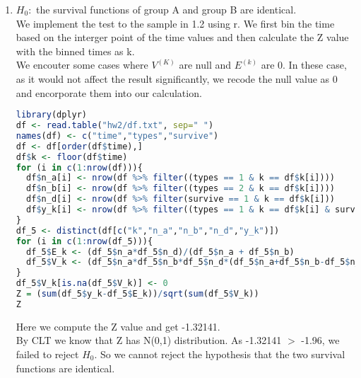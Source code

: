 \documentclass[11pt]{article}
\begin{document}
\begin{enumerate}
\begin{align*}
& (According \;to \;iid \;assumption \;of \;k)\\
& = Var[E[\sum \limits_{k=1}^{K-1} (y^{(k)} - E^{(k)})|(n_A^{(K)},n_B^{(K)},n_d^{(K)})]+0]+ E[Var[\sum \limits_{k=1}^{K-1} (y^{(k)} - E^{(k)})|(n_A^{(K)},n_B^{(K)},n_d^{(K)})]+\\
& Var[(y^{(K)} - E^{(K)})|(n_A^{(K)},n_B^{(K)},n_d^{(K)})]]\\
& = Var[\sum \limits_{k=1}^{K-1} (y^{(k)} - E^{(k)})]+ E[Var[(y^{(K)} - E^{(K)})|(n_A^{(K)},n_B^{(K)},n_d^{(K)})]]\\
& = Var[\sum \limits_{k=1}^{K-1} (y^{(k)} - E^{(k)})] + E[V^{(K)}]
\end{align*}
Similarly, we can apply this process to every other value of k, and get that:\\
$$Var[\sum \limits_{k=1}^K (y^{(k)} - E^{(k)})] = \sum \limits_{k=1}^{K}E[V^{(K)}]$$


\item
$H_0:$ the survival functions of group A and group B are identical.\\
We implement the test to the sample in 1.2 using r.
We first bin the time based on the interger point of the time values and then calculate the Z value with the binned times as k.\\
We encouter some cases where $V^{(K)}$ are null and $E^{(k)}$ are 0. In these case, as it would not affect the result significantly, we recode the null value as 0 and encorporate them into our calculation.\\
\begin{lstlisting}[language=R]
library(dplyr)
df <- read.table("hw2/df.txt", sep=" ")
names(df) <- c("time","types","survive")
df <- df[order(df$time),]
df$k <- floor(df$time)
for (i in c(1:nrow(df))){
  df$n_a[i] <- nrow(df %>% filter((types == 1 & k == df$k[i])))
  df$n_b[i] <- nrow(df %>% filter((types == 2 & k == df$k[i])))
  df$n_d[i] <- nrow(df %>% filter(survive == 1 & k == df$k[i]))
  df$y_k[i] <- nrow(df %>% filter((types == 1 & k == df$k[i] & survive == 1)))
}
df_5 <- distinct(df[c("k","n_a","n_b","n_d","y_k")])
for (i in c(1:nrow(df_5))){
  df_5$E_k <- (df_5$n_a*df_5$n_d)/(df_5$n_a + df_5$n_b)
  df_5$V_k <- (df_5$n_a*df_5$n_b*df_5$n_d*(df_5$n_a+df_5$n_b-df_5$n_d))/(((df_5$n_a+df_5$n_b)**2)*(df_5$n_a+df_5$n_b-1))
}
df_5$V_k[is.na(df_5$V_k)] <- 0
Z = (sum(df_5$y_k-df_5$E_k))/sqrt(sum(df_5$V_k))
Z
\end{lstlisting}
Here we compute the Z value and get -1.32141.\\
By CLT we know that Z has N(0,1) distribution. As -1.32141 $>$ -1.96, we failed to reject $H_0.$
So we cannot reject the hypothesis that the two survival functions are identical.\\


\end{enumerate}
\end{document}
